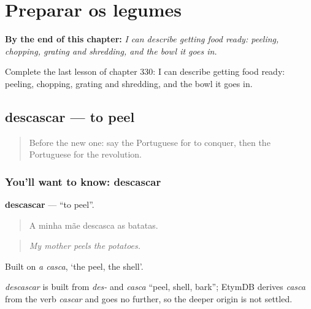 
\chapter{Preparar os legumes}
\label{ch:pt-preparar-os-legumes}

\begin{chapteropening}
\textbf{By the end of this chapter:} \emph{I can describe getting food ready: peeling, chopping, grating and shredding, and the bowl it goes in.}

Complete the last lesson of chapter 330: I can describe getting food ready: peeling, chopping, grating and shredding, and the bowl it goes in.
\end{chapteropening}

\section[descascar]{descascar — to peel}

\label{lesson:PT-C330-descascar}



\begin{quote}
Before the new one: say the Portuguese for to conquer, then the Portuguese for the revolution.
\end{quote}

\subsection*{You'll want to know: descascar}
\textbf{descascar} — \textquotedblleft{}to peel\textquotedblright{}.

\begin{quote}
A minha mãe descasca as batatas.
\end{quote}

\begin{quote}
\emph{My mother peels the potatoes.}
\end{quote}

Built on \emph{a casca}, ‘the peel, the shell’.

\begin{cousinweb}
\emph{descascar} is built from \emph{des-} and \emph{casca} \textquotedblleft{}peel, shell, bark\textquotedblright{}; EtymDB derives \emph{casca} from the verb \emph{cascar} and goes no further, so the deeper origin is not settled.
\end{cousinweb}

